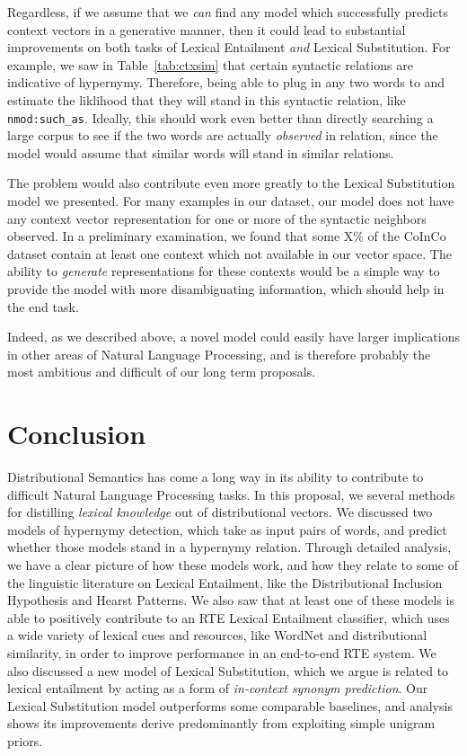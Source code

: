 \documentclass[12pt]{article}
\begin{document}
Regardless, if we assume that we {\em can} find any model which successfully
predicts context vectors in a generative manner, then it could lead to
substantial improvements on both tasks of Lexical Entailment {\em and} Lexical
Substitution. For example, we saw in Table~\ref{tab:ctxsim} that certain
syntactic relations are indicative of hypernymy. Therefore, being able to plug
in any two words to and estimate the liklihood that they will stand in this
syntactic relation, like {\tt nmod:such\_as}. Ideally, this should work even
better than directly searching a large corpus to see if the two words are
actually {\em observed} in relation, since the model would assume that similar
words will stand in similar relations.

The problem would also contribute even more greatly to the Lexical Substitution
model we presented. For many examples in our dataset, our model does not have
any context vector representation for one or more of the syntactic neighbors
observed. In a preliminary examination, we found that some X\% of the CoInCo
dataset contain at least one context which not available in our vector space.
The ability to {\em generate} representations for these contexts would be
a simple way to provide the model with more disambiguating information, which
should help in the end task.

Indeed, as we described above, a novel model could easily have larger
implications in other areas of Natural Language Processing, and is therefore
probably the most ambitious and difficult of our long term proposals.

\section{Conclusion}

Distributional Semantics has come a long way in its ability to contribute to
difficult Natural Language Processing tasks. In this proposal, we several
methods for distilling {\em lexical knowledge} out of distributional vectors.
We discussed two models of hypernymy detection, which take as input pairs of
words, and predict whether those models stand in a hypernymy relation.  Through
detailed analysis, we have a clear picture of how these models work, and how
they relate to some of the linguistic literature on Lexical Entailment, like
the Distributional Inclusion Hypothesis and Hearst Patterns. We also saw that
at least one of these models is able to positively contribute to an RTE Lexical
Entailment classifier, which uses a wide variety of lexical cues and resources,
like WordNet and distributional similarity, in order to improve performance in
an end-to-end RTE system. We also discussed a new model of Lexical
Substitution, which we argue is related to lexical entailment by acting as a
form of {\em in-context synonym prediction}. Our Lexical Substitution model
outperforms some comparable baselines, and analysis shows its improvements
derive predominantly from exploiting simple unigram priors.
\end{document}
